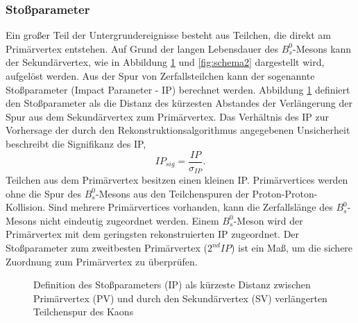\documentclass{article}
\begin{document}
\subsubsection{Stoßparameter}
Ein großer Teil der Untergrundereignisse besteht aus Teilchen, die direkt am Primärvertex entstehen. Auf Grund der langen Lebensdauer des $B_s^0$-Mesons kann der Sekundärvertex, wie in Abbildung \ref{fig:ip} und \ref{fig:schema2} dargestellt wird, aufgelöst werden. Aus der Spur von Zerfallsteilchen kann der sogenannte Stoßparameter (Impact Parameter - IP) berechnet werden. Abbildung \ref{fig:ip} definiert den Stoßparameter als die Distanz des kürzesten Abstandes der Verlängerung der Spur aus dem Sekundärvertex zum Primärvertex. Das Verhältnis des IP zur Vorhersage der durch den Rekonstruktionsalgorithmus angegebenen Unsicherheit beschreibt die Signifikanz des IP,
\[IP_{sig}=\frac{IP}{\sigma_{IP}}.\]
Teilchen aus dem Primärvertex besitzen einen kleinen IP. Primärvertices werden ohne die Spur des $B_s^0$-Mesons aus den Teilchenspuren der Proton-Proton-Kollision. Sind mehrere Primärvertices vorhanden, kann die Zerfallslänge des $B_s^0$-Mesons nicht eindeutig zugeordnet werden. Einem $B_s^0$-Meson wird der  Primärvertex mit dem geringsten rekonstruierten IP zugeordnet. Der Stoßparameter zum zweitbesten Primärvertex ($2^{nd}IP$) ist ein Maß, um die sichere Zuordnung zum Primärvertex zu überprüfen.%

\begin{figure}[h!]
	\centering
 	\caption{Definition des Stoßparameters (IP) als kürzeste Distanz zwischen Primärvertex (PV) und durch den Sekundärvertex (SV) verlängerten Teilchenspur des Kaons}
\label{fig:ip}
\end{figure}

\end{document}
